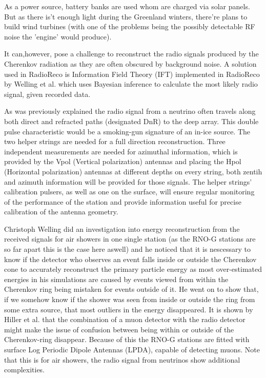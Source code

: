 \documentclass[11pt,a4paper,faculty=we,language=en,doctype=report]{cls/ugent-doc}
\begin{document}
As a power source, battery banks are used whom are charged via solar panels.
But as there is't enough light during the Greenland winters, there're plans to
build wind turbines (with one of the problems being the possibly detectable RF
noise the 'engine' would produce).

It can,however, pose a challenge to reconstruct the radio signals produced by
the Cherenkov radiation as they are often obscured by background
noise. A solution used in RadioReco is Information Field Theory
(IFT) implemented in RadioReco by Welling et al.\cite{Welling_2021}
which uses Bayesian inference to calculate the most likely radio
signal, given recorded data.  

As was previously explained the radio signal from a neutrino often travels
along both direct and refracted paths (designated DnR) to the deep array. 
This double pulse characteristic would be a smoking-gun signature of an in-ice
source. The two helper strings are needed for a full direction reconstruction.
Three independent measurements are needed for azimuthal information, which is
provided by the Vpol (Vertical polarization) antennas and placing the Hpol
(Horizontal polarization) antennas at different depths on every string, both
zentih and azimuth information will be provided for those signals. The helper
strings' calibration pulsers, as well as one on the surface, will ensure
regular monitoring of the performance of the station and provide information
useful for precise calibration of the antenna geometry.

Christoph Welling did an investigation into energy reconstruction from the
received signals\cite{Welling_2019} for air showers in one single station (as
the RNO-G stations are so far apart this is the case here aswell) and he
noticed that it is nescessary to know if the detector who observes an event
falls inside or outside the Cherenkov cone to accurately reconstruct the
primary particle energy as most over-estimated energies in his simulations are
caused by events viewed from within the Cherenkov ring being mistaken for
events outside of it. He went on to show that, if we somehow know if the shower
was seen from inside or outside the ring from some extra source, that most
outliers in the energy disappeared. It is shown by Hiller et
al.\cite{Hiller_2017} that the combination of a muon detector with the radio
detector might make the issue of confusion between being within or outside of
the Cherenkov-ring disappear. Because of this the RNO-G stations are fitted
with surface Log Periodic Dipole Antennas (LPDA), capable of detecting muons.
Note that this is for air showers, the radio signal from neutrinos show
additional complexities.
\newpage
\end{document}
